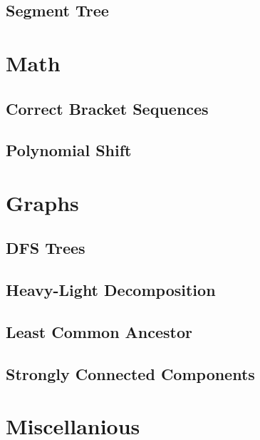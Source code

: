 \documentclass[12pt]{article}
\begin{document}
\subsection{Segment Tree} 


\section{Math}

\subsection{Correct Bracket Sequences} 
\subsection{Polynomial Shift} 


\section{Graphs}

\subsection{DFS Trees} 
\subsection{Heavy-Light Decomposition} 
\subsection{Least Common Ancestor} 
\subsection{Strongly Connected Components} 

\section{Miscellanious}

\end{document}
